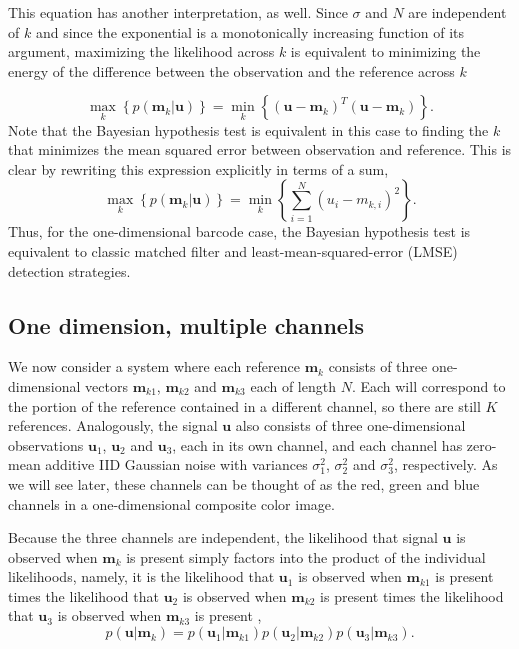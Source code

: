 This equation has another interpretation, as well. Since $\sigma$ and $N$ are independent of $k$ and since the exponential is a monotonically increasing function of its argument, maximizing the likelihood across $k$ is equivalent to minimizing the energy of the difference between the observation and the reference across $k$ 

\begin{equation}
\max_k   \left\{ p(\mathbf{m}_k|\mathbf{u}) \right\} = \min_k  \left\{ (\mathbf{u}-\mathbf{m}_k)^T(\mathbf{u}-\mathbf{m}_k) \right\}. 
\end{equation}
Note that the Bayesian hypothesis test is equivalent in this case to finding the $k$ that minimizes the mean squared error between observation and reference. This is clear by rewriting this expression explicitly in terms of a sum,
\begin{equation}
\max_k   \left\{ p(\mathbf{m}_k|\mathbf{u}) \right\} =  \min_k  \left\{ \sum_{i=1}^N  (u_i-m_{k,i})^2   \right\}. 
\end{equation}
Thus, for the one-dimensional barcode case, the Bayesian hypothesis test is equivalent to classic matched filter and least-mean-squared-error (LMSE) detection strategies.

\subsection{One dimension, multiple channels}\label{sec:simpleModel}
We now consider a system where each reference $\mathbf{m}_k$ consists of three one-dimensional vectors $\mathbf{m}_{k1}$, $\mathbf{m}_{k2}$ and $\mathbf{m}_{k3}$ each of length $N$. Each will correspond to the portion of the reference contained in a different channel, so there are still $K$ references. Analogously, the signal $\mathbf{u}$ also consists of three one-dimensional observations $\mathbf{u}_1$, $\mathbf{u}_2$ and $\mathbf{u}_3$, each in its own channel, and each channel has zero-mean additive IID Gaussian noise with variances $\sigma_1^2$, $\sigma_2^2$ and $\sigma_3^2$, respectively. As we will see later, these channels can be thought of as the red, green and blue channels in a one-dimensional composite color image. 

Because the three channels are independent, the likelihood that signal $\mathbf{u}$ is observed when $\mathbf{m}_k$ is present simply factors into the product of the individual likelihoods, namely, it is the likelihood that $\mathbf{u}_1$ is observed when $\mathbf{m}_{k1}$ is present times the likelihood that $\mathbf{u}_2$ is observed when $\mathbf{m}_{k2}$ is present times the likelihood that $\mathbf{u}_3$ is observed when $\mathbf{m}_{k3}$ is present \citep{bretthorst_probability_2003},
\begin{equation}
p(\mathbf{u}|\mathbf{m}_k) = p(\mathbf{u}_1|\mathbf{m}_{k1})p(\mathbf{u}_2|\mathbf{m}_{k2})p(\mathbf{u}_3|\mathbf{m}_{k3}).
\end{equation}

